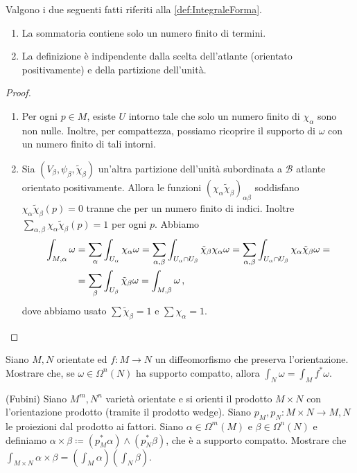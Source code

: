 \begin{proposition}
	Valgono i due seguenti fatti riferiti alla \cref{def:IntegraleForma}.
	\begin{enumerate}
		\item La sommatoria contiene solo un numero finito di termini.
		\item La definizione è indipendente dalla scelta dell'atlante (orientato positivamente) e della partizione dell'unità.
	\end{enumerate}
\end{proposition}
\begin{proof}
	\begin{enumerate}
		\item Per ogni $p\in M$, esiste $U$ intorno tale che solo un numero finito di $\chi_\alpha$ sono non nulle. Inoltre, per compattezza, possiamo ricoprire il supporto di $\omega$ con un numero finito di tali intorni.
		
		\item Sia $(V_\beta, \psi_\beta, \tilde \chi_\beta)$ un'altra partizione dell'unità subordinata a $\mathcal B$ atlante orientato positivamente. Allora le funzioni $(\chi_\alpha \tilde\chi_\beta)_{\alpha\beta}$ soddisfano $\chi_\alpha \tilde\chi_\beta(p) = 0$ tranne che per un numero finito di indici. Inoltre $\sum_{\alpha,\beta} \chi_\alpha \tilde\chi_\beta(p) = 1$ per  ogni $p$.
		Abbiamo
		\begin{align*}
			\int_{M,\alpha} \omega &= \sum_\alpha \int_{U_\alpha}\chi_\alpha \omega = \sum_{\alpha,\beta} \int_{U_\alpha \cap U_\beta} \tilde \chi_\beta \chi_\alpha \omega =\sum_{\alpha,\beta} \int_{U_\alpha\cap U_\beta}  \chi_\alpha \tilde \chi_\beta \omega =\\
			&=\sum_\beta \int_{U_\beta} \tilde\chi_\beta \omega = \int_{M,\beta} \omega \, \text{, }
		\end{align*}
		dove abbiamo usato $\sum \tilde \chi_\beta = 1$ e $\sum \chi_\alpha = 1$.
	\end{enumerate}
\end{proof}

\begin{exercise}
	Siano $M,N$ orientate ed $f:M\to N$ un diffeomorfismo che preserva l'orientazione. Mostrare che, se $\omega\in\Omega^n(N)$ ha supporto compatto, allora $\int_N \omega = \int_M f^*\omega$.
\end{exercise}

\begin{exercise}
	(Fubini) Siano $M^m,N^n$ varietà orientate e si orienti il prodotto $M\times N$ con l'orientazione prodotto (tramite il prodotto wedge). Siano $p_M,p_N : M\times N \to M,N$ le proiezioni dal prodotto ai fattori.
	Siano $\alpha \in \Omega^m(M)$ e $\beta \in \Omega^n(N)$ e definiamo
	$\alpha \times \beta \coloneqq (p_M^*\alpha) \wedge (p_N^*\beta)$, che è a supporto compatto.
	Mostrare che $\int_{M\times N} \alpha \times \beta = (\int_M\alpha )( \int_N \beta)$.
\end{exercise}


